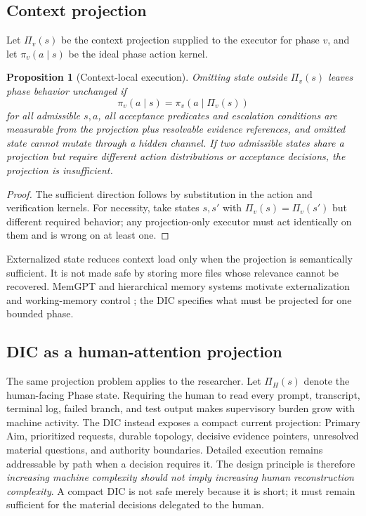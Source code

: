 \documentclass[11pt]{article}
\newtheorem{proposition}[definition]{Proposition}
\begin{document}
\subsection{Context projection}
Let $\Pi_v(s)$ be the context projection supplied to the executor for phase $v$, and let $\pi_v(a\mid s)$ be the ideal phase action kernel.
\begin{proposition}[Context-local execution]
\label{prop:context}
Omitting state outside $\Pi_v(s)$ leaves phase behavior unchanged if
\[
\pi_v(a\mid s)=\pi_v(a\mid \Pi_v(s))
\]
for all admissible $s,a$, all acceptance predicates and escalation conditions are measurable from the projection plus resolvable evidence references, and omitted state cannot mutate through a hidden channel. If two admissible states share a projection but require different action distributions or acceptance decisions, the projection is insufficient.
\end{proposition}
\begin{proof}
The sufficient direction follows by substitution in the action and verification kernels. For necessity, take states $s,s'$ with $\Pi_v(s)=\Pi_v(s')$ but different required behavior; any projection-only executor must act identically on them and is wrong on at least one.
\end{proof}
Externalized state reduces context load only when the projection is semantically sufficient. It is not made safe by storing more files whose relevance cannot be recovered. MemGPT and hierarchical memory systems motivate externalization and working-memory control \citep{packer2023memgpt,wang2024hiagent}; the DIC specifies what must be projected for one bounded phase.

\subsection{DIC as a human-attention projection}
The same projection problem applies to the researcher. Let $\Pi_H(s)$ denote the human-facing Phase state. Requiring the human to read every prompt, transcript, terminal log, failed branch, and test output makes supervisory burden grow with machine activity. The DIC instead exposes a compact current projection: Primary Aim, prioritized requests, durable topology, decisive evidence pointers, unresolved material questions, and authority boundaries. Detailed execution remains addressable by path when a decision requires it. The design principle is therefore \emph{increasing machine complexity should not imply increasing human reconstruction complexity}. A compact DIC is not safe merely because it is short; it must remain sufficient for the material decisions delegated to the human.
\end{document}
